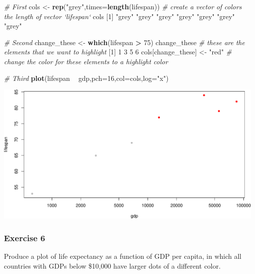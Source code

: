 \documentclass[
]{book}
\newenvironment{Shaded}{\begin{snugshade}}{\end{snugshade}}
\newcommand{\CommentTok}[1]{\textcolor[rgb]{0.56,0.35,0.01}{\textit{#1}}}
\newcommand{\DataTypeTok}[1]{\textcolor[rgb]{0.13,0.29,0.53}{#1}}
\newcommand{\DecValTok}[1]{\textcolor[rgb]{0.00,0.00,0.81}{#1}}
\newcommand{\KeywordTok}[1]{\textcolor[rgb]{0.13,0.29,0.53}{\textbf{#1}}}
\newcommand{\NormalTok}[1]{#1}
\newcommand{\OperatorTok}[1]{\textcolor[rgb]{0.81,0.36,0.00}{\textbf{#1}}}
\newcommand{\StringTok}[1]{\textcolor[rgb]{0.31,0.60,0.02}{#1}}
\begin{document}
\begin{Shaded}
\begin{Highlighting}[]
\CommentTok{# First}
\NormalTok{cols <-}\StringTok{ }\KeywordTok{rep}\NormalTok{(}\StringTok{"grey"}\NormalTok{,}\DataTypeTok{times=}\KeywordTok{length}\NormalTok{(lifespan)) }\CommentTok{# create a vector of colors the length of vector `lifespan`}
\NormalTok{cols}
\NormalTok{[}\DecValTok{1}\NormalTok{] }\StringTok{"grey"} \StringTok{"grey"} \StringTok{"grey"} \StringTok{"grey"} \StringTok{"grey"} \StringTok{"grey"} \StringTok{"grey"}

\CommentTok{# Second}
\NormalTok{change_these <-}\StringTok{ }\KeywordTok{which}\NormalTok{(lifespan }\OperatorTok{>}\StringTok{ }\DecValTok{75}\NormalTok{) }
\NormalTok{change_these }\CommentTok{# these are the elements that we want to highlight}
\NormalTok{[}\DecValTok{1}\NormalTok{] }\DecValTok{1} \DecValTok{3} \DecValTok{5} \DecValTok{6}
\NormalTok{cols[change_these] <-}\StringTok{ "red"}  \CommentTok{# change the color for these elements to a highlight color}

\CommentTok{# Third}
\KeywordTok{plot}\NormalTok{(lifespan }\OperatorTok{~}\StringTok{ }\NormalTok{gdp,}\DataTypeTok{pch=}\DecValTok{16}\NormalTok{,}\DataTypeTok{col=}\NormalTok{cols,}\DataTypeTok{log=}\StringTok{"x"}\NormalTok{)}
\end{Highlighting}
\end{Shaded}

\includegraphics{figures/unnamed-chunk-122-1.pdf}

\hypertarget{exercise-6-1}{%
\subsubsection*{Exercise 6}\label{exercise-6-1}}

Produce a plot of life expectancy as a function of GDP per capita, in which all countries with GDPs below \$10,000 have larger dots of a different color.
\end{document}
